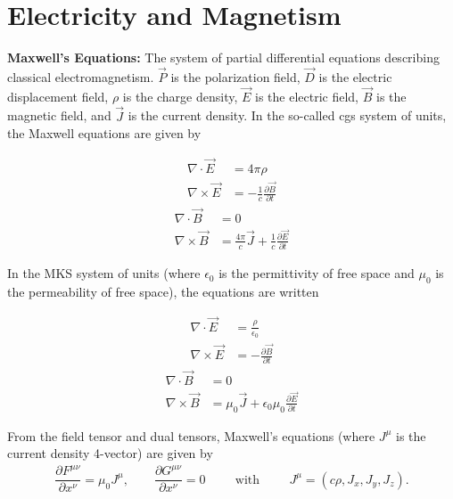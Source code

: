 \chapter{Electricity and Magnetism}
\thispagestyle{fancy}
\textbf{Maxwell's Equations:} The system of partial differential equations describing classical electromagnetism. $\vec{P}$ is the polarization field, $\vec{D}$ is the electric displacement field, $\rho$ is the charge density, $\vec{E}$ is the electric field, $\vec{B}$ is the magnetic field, and $\vec{J}$ is the current density. In the so-called cgs system of units, the Maxwell equations are given by 
\begin{multicols}{2}
	\noindent
\begin{align}
	\nabla \cdot \vec{E} &= 4\pi\rho \\
	\nabla \times \vec{E} &= -\frac{1}{c}\frac{\partial \vec{B}}{\partial t} 
\end{align}
\begin{align}
	\nabla \cdot \vec{B} &= 0 \\
	\nabla \times \vec{B} &= \frac{4\pi}{c}\vec{J}+\frac{1}{c}\frac{\partial \vec{E}}{\partial t} 
\end{align}
\end{multicols}
In the MKS system of units (where $\epsilon_0$ is the permittivity of free space and $\mu_0$ is the permeability of free space), the equations are written 
\begin{multicols}{2}
	\noindent
	\begin{align}
		\nabla \cdot \vec{E} &= \frac{\rho}{\epsilon_0}\\
		\nabla \times \vec{E} &= -\frac{\partial \vec{B}}{\partial t} 
	\end{align}
	\begin{align}
		\nabla \cdot \vec{B} &= 0 \\
		\nabla \times \vec{B} &= \mu_0\vec{J}+\epsilon_0\mu_0\frac{\partial \vec{E}}{\partial t} 
	\end{align}
\end{multicols}
From the field tensor and dual tensors, Maxwell's equations (where $J^{\mu}$ is the current density 4-vector) are given by
\begin{align}
\dfrac{\partial F^{\mu\nu}}{\partial x^{\nu}} = \mu_0 J^{\mu}, \qquad \dfrac{\partial G^{\mu\nu}}{\partial x^{\nu}} = 0 \hspace{1cm}\textrm{with}\hspace{1cm} J^{\mu} = (c\rho,J_x,J_y,J_z).
\end{align}
